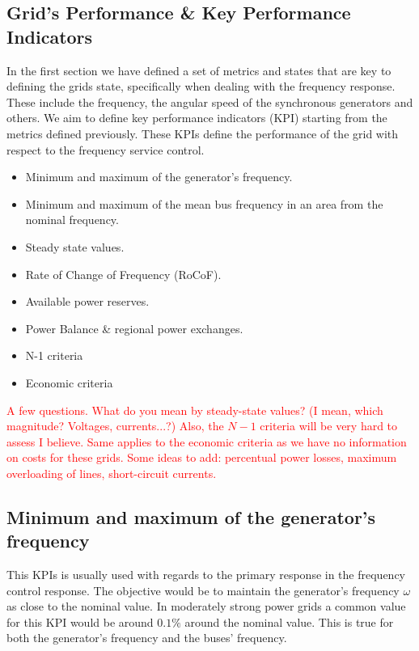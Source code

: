 \documentclass{article}
\begin{document}
\subsection{Grid's Performance \& Key Performance Indicators}

In the first section we have defined a set of metrics and states that are key to defining the grids state, specifically when dealing with the frequency response. These include the frequency, the angular speed of the synchronous generators and others. We aim to define key performance indicators (KPI) starting from the metrics defined previously. These KPIs define the performance of the grid with respect to the frequency service control. 

\begin{itemize}
    \item Minimum and maximum of the generator's frequency.
    \item Minimum and maximum of the mean bus frequency in an area from the nominal frequency.
    \item Steady state values.
    \item Rate of Change of Frequency (RoCoF).
    \item Available power reserves.
    \item Power Balance \& regional power exchanges.
    \item N-1 criteria
    \item Economic criteria
\end{itemize}

\textcolor{red}{A few questions. What do you mean by steady-state values? (I mean, which magnitude? Voltages, currents...?) Also, the $N-1$ criteria will be very hard to assess I believe. Same applies to the economic criteria as we have no information on costs for these grids. Some ideas to add: percentual power losses, maximum overloading of lines, short-circuit currents.} 

\subsection*{Minimum and maximum of the generator's frequency}

This KPIs is usually used with regards to the primary response in the frequency control response. The objective would be to maintain the generator's frequency $\omega$ as close to the nominal value. In moderately strong power grids a common value for this KPI would be around $0.1\%$ around the nominal value. This is true for both the generator's frequency and the buses' frequency.
\end{document}
